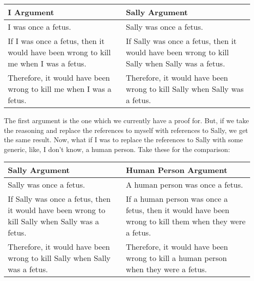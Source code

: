 \begin{tabular}{p{1.75in}|p{1.75in}}
    I Argument&Sally Argument\\\hline
    I was once a fetus.&Sally was once a fetus.\\\hline
    If I was once a fetus, then it would have been wrong to kill me when I was a fetus.&If Sally was once a fetus, then it would have been wrong to kill Sally when Sally was a fetus.\\\hline 
    Therefore, it would have been wrong to kill me when I was a fetus.&    Therefore, it would have been wrong to kill Sally when Sally was a fetus.
 \end{tabular}

The first argument is the one which we currently have a proof for. But, if we take the reasoning and replace the references to myself with references to Sally, we get the same result. Now, what if I was to replace the references to Sally with some generic, like, I don't know, a human person. Take these for the comparison:

\begin{tabular}{p{1.75in}|p{1.75in}}
    Sally Argument&Human Person Argument\\\hline
    Sally was once a fetus.&A human person was once a fetus.\\\hline
    If Sally was once a fetus, then it would have been wrong to kill Sally when Sally was a fetus.& If a human person was once a fetus, then it would have been wrong to kill them when they were a fetus.\\\hline 
    Therefore, it would have been wrong to kill Sally when Sally was a fetus.& Therefore, it would have been wrong to kill a human person when they were a fetus. 
\end{tabular}

